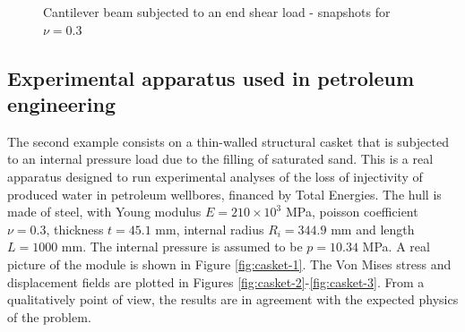 \documentclass{wccm2024}
\begin{document}
\begin{figure} [!htb]
    \caption{Cantilever beam subjected to an end shear load - snapshots for $\nu=0.3$}
    \label{fig:bishop-snapshot}
\end{figure}

\subsection{Experimental apparatus used in petroleum engineering}

The second example consists on a thin-walled structural casket that is subjected to an internal pressure load due to the filling of saturated sand. This is a real apparatus designed to run experimental analyses of the loss of injectivity of produced water in petroleum wellbores, financed by Total Energies. The hull is made of steel, with Young modulus $E=210\times 10^{3}$ MPa, poisson coefficient $\nu=0.3$, thickness $t=45.1$ mm, internal radius $R_i=344.9$ mm and length $L=1000$ mm. The internal pressure is assumed to be $p=10.34$ MPa. A real picture of the module is shown in Figure \ref{fig:casket-1}. The Von Mises stress and displacement fields are plotted in Figures \ref{fig:casket-2}-\ref{fig:casket-3}. From a qualitatively point of view, the results are in agreement with the expected physics of the problem.
\end{document}

